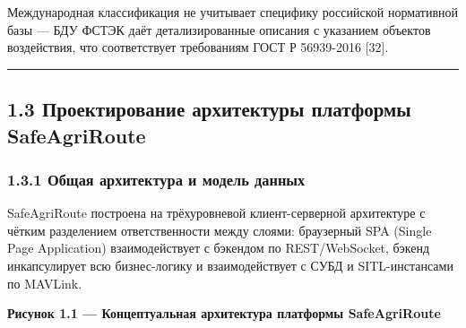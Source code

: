 Международная классификация не учитывает специфику российской нормативной базы --- БДУ ФСТЭК даёт детализированные описания с указанием объектов воздействия, что соответствует требованиям ГОСТ Р 56939-2016 {[}32{]}.

\begin{center}\rule{0.5\linewidth}{0.5pt}\end{center}

\hypertarget{ux43fux440ux43eux435ux43aux442ux438ux440ux43eux432ux430ux43dux438ux435-ux430ux440ux445ux438ux442ux435ux43aux442ux443ux440ux44b-ux43fux43bux430ux442ux444ux43eux440ux43cux44b-safeagriroute}{%
\subsection{1.3 Проектирование архитектуры платформы SafeAgriRoute}\label{ux43fux440ux43eux435ux43aux442ux438ux440ux43eux432ux430ux43dux438ux435-ux430ux440ux445ux438ux442ux435ux43aux442ux443ux440ux44b-ux43fux43bux430ux442ux444ux43eux440ux43cux44b-safeagriroute}}

\hypertarget{ux43eux431ux449ux430ux44f-ux430ux440ux445ux438ux442ux435ux43aux442ux443ux440ux430-ux438-ux43cux43eux434ux435ux43bux44c-ux434ux430ux43dux43dux44bux445}{%
\subsubsection{1.3.1 Общая архитектура и модель данных}\label{ux43eux431ux449ux430ux44f-ux430ux440ux445ux438ux442ux435ux43aux442ux443ux440ux430-ux438-ux43cux43eux434ux435ux43bux44c-ux434ux430ux43dux43dux44bux445}}

SafeAgriRoute построена на трёхуровневой клиент-серверной архитектуре с чётким разделением ответственности между слоями: браузерный SPA (Single Page Application) взаимодействует с бэкендом по REST/WebSocket, бэкенд инкапсулирует всю бизнес-логику и взаимодействует с СУБД и SITL-инстансами по MAVLink.

\textbf{Рисунок 1.1 --- Концептуальная архитектура платформы SafeAgriRoute}

